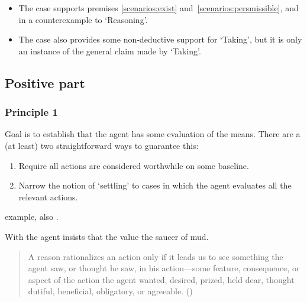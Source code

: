 \documentclass[10pt]{article}
\begin{document}
\begin{itemize}
\item The case supports premises \ref{scenarios:exist} and~\ref{scenarios:persmissible}, and in a counterexample to `Reasoning'.
\item The case also provides some non-deductive support for `Taking', but it is only an instance of the general claim made by `Taking'.
\end{itemize}


\newpage

\subsection{Positive part}
\label{sec:positive-part}


\subsubsection{Principle 1}
\label{sec:principle-1}



Goal is to establish that the agent has some evaluation of the means.
There are a (at least) two straightforward ways to guarantee this:
\begin{enumerate}
\item Require all actions are considered worthwhile on some baseline.
\item Narrow the notion of `settling' to cases in which the agent evaluates all the relevant actions.
\end{enumerate}

\citeauthor{Anscombe:1957aa} example, also \citeauthor{Quinn:1993aa}.

With \citeauthor{Anscombe:1957aa} the agent insists that the value the saucer of mud.


\begin{quote}
  A reason rationalizes an action only if it leads us to see something the agent saw, or thought he saw, in his action---some feature, consequence, or aspect of the action the agent wanted, desired, prized, held dear, thought dutiful, beneficial, obligatory, or agreeable.\nolinebreak
  \mbox{}\hfill\mbox{(\citeyear[686]{Davidson:1963aa})}
\end{quote}
\end{document}
